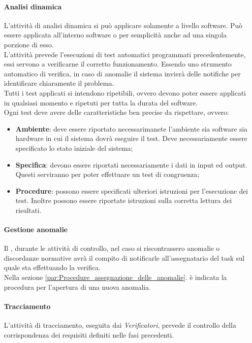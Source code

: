 			\paragraph{Analisi dinamica} %
			\label{par:analisi_dinamica}
			L'attività di analisi dinamica si può applicare solamente a livello software. Può essere applicata all'interno software o per semplicità anche ad una singola porzione di esso.\\
			L'attività prevede l'esecuzioni di test automatici programmati precedentemente, essi servono a verificarne il corretto funzionamento. Essendo uno strumento automatico di verifica, in caso di anomalie il sistema invierà delle notifiche per identificare chiaramente il problema.\\
			Tutti i test applicati si intendono ripetibili, ovvero devono poter essere applicati in qualsiasi momento e ripetuti per tutta la durata del software.\\
			Ogni test deve avere delle caratteristiche ben precise da rispettare, ovvero:
			\begin{itemize}
				\item \textbf{Ambiente}: deve essere riportato necessarimanete l'ambiente sia software sia hardware in cui il sistema dovrà eseguire il test. Deve necessariamente essere specificato lo stato iniziale del sistema;
				\item \textbf{Specifica}: devono essere riportati necessariamente i dati in input ed output. Questi serviranno per poter effettuare un test di congruenza;
				\item \textbf{Procedure}: possono essere specificati ulteriori istruzioni per l'esecuzione dei test. Inoltre possono essere riportate istruzioni sulla corretta lettura dei risultati.
			\end{itemize}

			\paragraph{Gestione anomalie}
			Il \roleVerifier, durante le attività di controllo, nel caso si riscontrassero anomalie o discordanze normative avrà il compito di notificarle all'assegnatario del task sul quale sta effettuando la verifica.\\
			Nella sezione \ref{par:Procedure_assegnazione_delle_anomalie}. è indicata la procedura per l'apertura di una nuova anomalia.

			\paragraph{Tracciamento} %
			\label{par:tracciamento}
			L'attività di tracciamento, eseguita dai \emph{Verificatori}, prevede il controllo della corrispondenza dei requisiti definiti nelle fasi precedenti.


